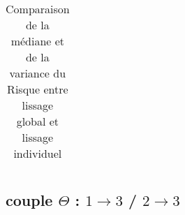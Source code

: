 \begin{table}[H]
\begin{tabularx}{\textwidth}{ccccXXXX}
	\bottomrule
\end{tabularx}
\caption{Comparaison de la médiane et de la variance du Risque entre lissage global et lissage individuel}
\label{tab:couple_1312_indiv_vs_glob}
\end{table}

\subsection{couple $\Theta$ : $1 \rightarrow 3$ / $2 \rightarrow 3$}



